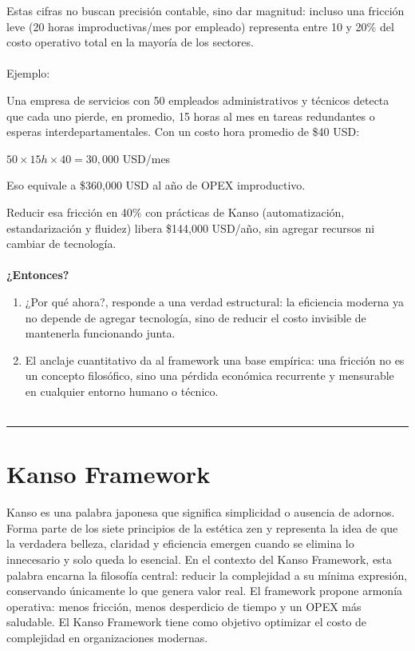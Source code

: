 Estas cifras no buscan precisión contable, sino dar magnitud: incluso una fricción leve 
(20 horas improductivas/mes por empleado) representa entre 10 y 20\% del costo operativo 
total en la mayoría de los sectores.
\\
\\
Ejemplo:

Una empresa de servicios con 50 empleados administrativos y técnicos detecta que cada uno pierde, en promedio, 
15 horas al mes en tareas redundantes o esperas interdepartamentales.
Con un costo hora promedio de \$40 USD:

\begin{center}
$50 \times 15h \times 40 = 30{,}000$ USD/mes
\end{center}

Eso equivale a \$360,000 USD al año de OPEX improductivo.

Reducir esa fricción en 40\% con prácticas de Kanso (automatización, estandarización y fluidez) 
libera \$144,000 USD/año, sin agregar recursos ni cambiar de tecnología.
\\
\\
\textbf{¿Entonces?}

\begin{enumerate}
    \item ¿Por qué ahora?, responde a una verdad estructural: la eficiencia moderna ya no depende de agregar tecnología, sino de reducir el costo invisible de mantenerla funcionando junta.
    \item El anclaje cuantitativo da al framework una base empírica: una fricción no es un concepto filosófico, sino una pérdida económica recurrente y mensurable en cualquier entorno humano o técnico.
\\
\\
\end{enumerate}


\hrule
\section{Kanso Framework}

Kanso es una palabra japonesa que significa simplicidad o ausencia de adornos. 
Forma parte de los siete principios de la estética zen y representa la idea de que la verdadera belleza, 
claridad y eficiencia emergen cuando se elimina lo innecesario y solo queda lo esencial.
En el contexto del Kanso Framework, esta palabra encarna la filosofía central: reducir la 
complejidad a su mínima expresión, conservando únicamente lo que genera valor real.
El framework propone armonía operativa: menos fricción, menos desperdicio de tiempo y un OPEX más saludable.
El Kanso Framework tiene como objetivo optimizar el costo de complejidad en organizaciones modernas.

